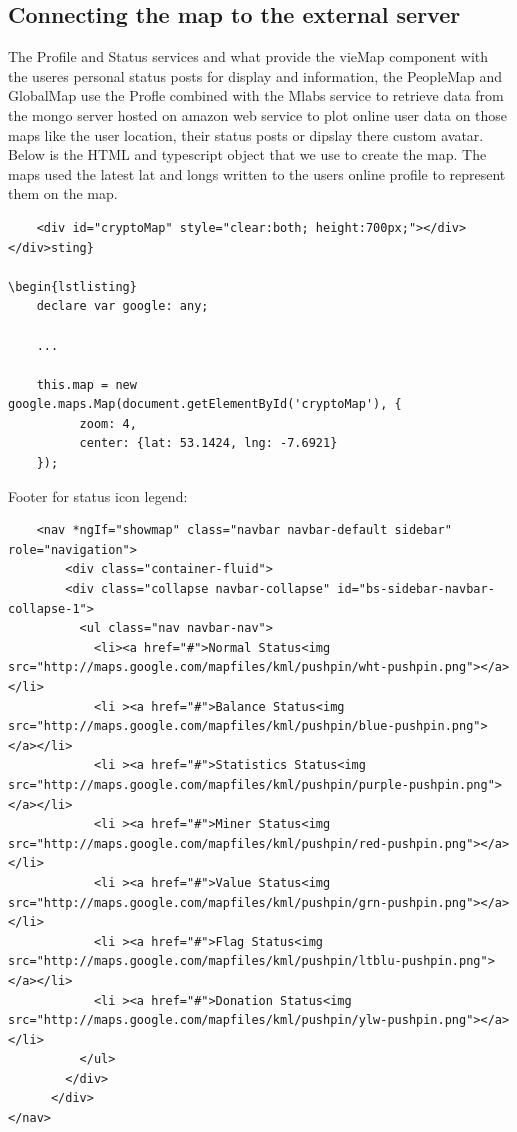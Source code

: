 \subsection{Connecting the map to the external server}
 The Profile and Status services and what provide the vieMap component with the useres personal status posts for display and information, the PeopleMap and GlobalMap use the Profle combined with the Mlabs service to retrieve data from the mongo server hosted on amazon web service to plot online user data on those maps like the user location, their status posts or dipslay there custom avatar. Below is the HTML and typescript object that we use to create the map. The maps used the latest lat and longs written to the users online profile to represent them on the map.

\begin{lstlisting}
    <div id="cryptoMap" style="clear:both; height:700px;"></div>
</div>sting}

\begin{lstlisting}
    declare var google: any;

    ...
    
    this.map = new google.maps.Map(document.getElementById('cryptoMap'), {
          zoom: 4,
          center: {lat: 53.1424, lng: -7.6921}
    });
\end{lstlisting}

Footer for status icon legend:
\begin{lstlisting}
    <nav *ngIf="showmap" class="navbar navbar-default sidebar" role="navigation">
        <div class="container-fluid">
        <div class="collapse navbar-collapse" id="bs-sidebar-navbar-collapse-1">
          <ul class="nav navbar-nav">
            <li><a href="#">Normal Status<img src="http://maps.google.com/mapfiles/kml/pushpin/wht-pushpin.png"></a></li>     
            <li ><a href="#">Balance Status<img src="http://maps.google.com/mapfiles/kml/pushpin/blue-pushpin.png"></a></li>        
            <li ><a href="#">Statistics Status<img src="http://maps.google.com/mapfiles/kml/pushpin/purple-pushpin.png"></a></li>
            <li ><a href="#">Miner Status<img src="http://maps.google.com/mapfiles/kml/pushpin/red-pushpin.png"></a></li>        
            <li ><a href="#">Value Status<img src="http://maps.google.com/mapfiles/kml/pushpin/grn-pushpin.png"></a></li>
            <li ><a href="#">Flag Status<img src="http://maps.google.com/mapfiles/kml/pushpin/ltblu-pushpin.png"></a></li>        
            <li ><a href="#">Donation Status<img src="http://maps.google.com/mapfiles/kml/pushpin/ylw-pushpin.png"></a></li>              
          </ul>
        </div>
      </div>
</nav>
\end{lstlisting}

